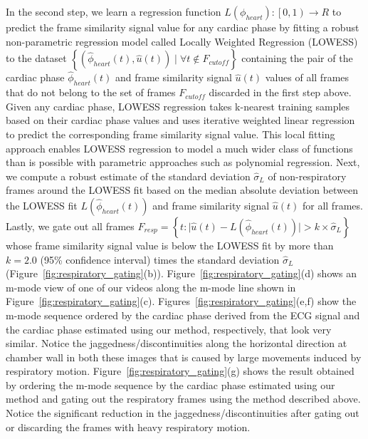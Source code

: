 \documentclass[journal]{IEEEtran}
\begin{document}
In the second step, we learn a regression function $L(\phi_{heart}) : \left [  0, 1\right ) \to R$ to predict the frame similarity signal value for any cardiac phase by fitting a robust non-parametric regression model called Locally Weighted Regression (LOWESS)~\cite{Cleveland1988} to the dataset $\left \{ \left(\hat{\phi}_{heart}(t), \hat{u}(t) \right) \mid \forall t \notin F_{cutoff}  \right \}$ containing the pair of the cardiac phase $\hat{\phi}_{heart}(t)$ and frame similarity signal $\hat{u}(t)$  values of all frames that do not belong to the set of frames $F_{cutoff}$ discarded in the first step above. Given any cardiac phase, LOWESS regression takes k-nearest training samples based on their cardiac phase values and uses  iterative weighted linear regression to predict the corresponding frame similarity signal value. This local fitting approach enables LOWESS regression to model a much wider class of functions than is possible with parametric approaches such as polynomial regression. Next, we compute a robust estimate of the standard deviation $\hat{\sigma}_{L}$ of non-respiratory frames around the LOWESS fit based on the median absolute deviation between the LOWESS fit $L( \hat{\phi}_{heart}(t) )$ and frame similarity signal $\hat{u}(t)$ for all frames. Lastly, we gate out all frames $F_{resp} = \left \{ t : \lvert \hat{u}(t) - L( \hat{\phi}_{heart}(t) ) \rvert   > k \times \hat{\sigma}_{L}  \right \}$ whose frame similarity signal value is below the LOWESS fit by more than $k = 2.0$ (95\% confidence interval) times the standard deviation $\hat{\sigma}_{L}$ (Figure~\ref{fig:respiratory_gating}(b)). Figure~\ref{fig:respiratory_gating}(d) shows an m-mode view of one of our videos along the m-mode line shown in Figure~\ref{fig:respiratory_gating}(c). Figures~\ref{fig:respiratory_gating}(e,f) show the m-mode sequence ordered by the cardiac phase derived from the ECG signal and the cardiac phase estimated using our method, respectively, that look very similar. Notice the jaggedness/discontinuities along the horizontal direction at chamber wall in both these images that is caused by large movements induced by respiratory motion. Figure~\ref{fig:respiratory_gating}(g) shows the result obtained by ordering the m-mode sequence by the cardiac phase estimated using our method and gating out the respiratory frames using the method described above. Notice the significant reduction in the jaggedness/discontinuities after gating out or discarding the frames with heavy respiratory motion.
%
\vspace{-0.3cm}
\end{document}
